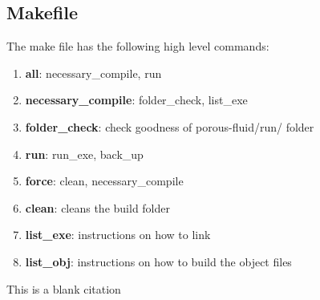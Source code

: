 \documentclass[
	12pt
] {article}
\begin{document}
\subsection{Makefile}
	The make file has the following high level commands:
	\begin{enumerate}
		\item \textbf{all}: necessary\_compile, run
		\item \textbf{necessary\_compile}: folder\_check, list\_exe
		\item \textbf{folder\_check}: check goodness of porous-fluid/run/ folder
		\item \textbf{run}: run\_exe, back\_up
		\item \textbf{force}: clean, necessary\_compile
		\item \textbf{clean}: cleans the build folder
		\item \textbf{list\_exe}: instructions on how to link
		\item \textbf{list\_obj}: instructions on how to build the object files
	\end{enumerate}

	This is a blank citation \cite{wikipedia-gini}


\end{document}
